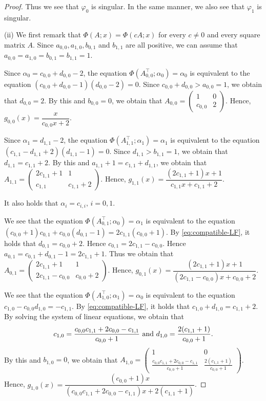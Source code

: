 \documentclass[a4paper, reqno, 11pt]{amsart}
\theoremstyle{definition}
\begin{document}
\begin{proof}
Thus we see that $\varphi_0$ is singular. 
In the same manner, we also see that $\varphi_1$ is singular. 

(ii) We first remark that $\Phi(A;x) = \Phi(cA;x)$ for every $c \ne 0$ and every square matrix $A$. 
Since $a_{0,0}, a_{1,0}, b_{0,1}$ and $b_{1,1}$ are all positive, 
we can assume that $a_{0,0} = a_{1,0} = b_{0,1} = b_{1,1} = 1$. 

Since $\alpha_0 = c_{0,0} + d_{0,0} - 2$, 
the equation $\Phi \left(A_{0,0}^{\top}; \alpha_0 \right) = \alpha_0$ is equivalent to  the equation $(c_{0,0} + d_{0,0} -1)(d_{0,0} - 2) = 0$. 
Since $c_{0,0} + d_{0,0} > a_{0,0} = 1$,  we obtain that $d_{0,0} = 2$. 
By this and $b_{0,0} = 0$, 
we obtain that 
$A_{0,0} = \begin{pmatrix} 1 & 0 \\ c_{0,0} & 2 \end{pmatrix}$.  
Hence, 
$g_{0,0}(x) = \dfrac{x}{c_{0,0} x + 2}$. 


Since $\alpha_1 =  d_{1,1} - 2$, 
the equation $\Phi \left(A_{1,1}^{\top}; \alpha_1 \right) = \alpha_1$ is equivalent to  the equation $(c_{1,1} - d_{1,1} + 2)(d_{1,1} - 1) = 0$. 
Since $d_{1,1} > b_{1,1} = 1$, we obtain that $d_{1,1} = c_{1,1} + 2$. 
By this and $a_{1,1} + 1 = c_{1,1} + d_{1,1}$, 
we obtain that 
$A_{1,1} = \begin{pmatrix} 2c_{1,1} + 1 & 1 \\ c_{1,1} & c_{1,1} + 2 \end{pmatrix}$.  
Hence, 
$g_{1,1}(x) = \dfrac{(2c_{1,1} + 1)x + 1}{c_{1,1} x + c_{1,1} + 2}$. 

It also holds that $\alpha_i = c_{i,i}, \, i = 0,1$. 


We see that the equation $\Phi \left(A_{0,1}^{\top}; \alpha_0 \right) = \alpha_1$ is equivalent to  the equation $(c_{0,0} + 1)c_{0,1} + c_{0,0} (d_{0,1} - 1) = 2c_{1,1} (c_{0,0} + 1)$. 
By \eqref{eq:compatible-LF}, 
it holds that $d_{0,1} = c_{0,0} + 2$.  
Hence $c_{0,1} = 2 c_{1,1} - c_{0,0}$. 
Hence $a_{0,1} = c_{0,1} + d_{0,1} - 1 = 2c_{1,1} + 1$. 
Thus we obtain that $A_{0,1} = \begin{pmatrix} 2c_{1,1} + 1 & 1 \\ 2c_{1,1} - c_{0,0} & c_{0,0} + 2 \end{pmatrix}$.  
Hence, 
$g_{0,1}(x) = \dfrac{(2c_{1,1} + 1)x + 1}{(2c_{1,1}-c_{0,0}) x + c_{0,0} + 2}$. 

We see that the equation $\Phi \left(A_{1,0}^{\top}; \alpha_1 \right) = \alpha_0$ is equivalent to  the equation $c_{1,0} - c_{0,0} d_{1,0} = -c_{1,1}$. 
By \eqref{eq:compatible-LF}, 
it holds that $c_{1,0} + d_{1,0} = c_{1,1} + 2$.  
By solving the system of linear equations, we obtain that 
\[ c_{1,0} = \frac{c_{0,0} c_{1,1} + 2 c_{0,0} - c_{1,1}}{c_{0,0} + 1} \textup{ and }  d_{1,0} = \frac{2(c_{1,1} + 1)}{c_{0,0} + 1}. \]
By this and $b_{1,0} = 0$, 
we obtain that 
$A_{1,0} = \begin{pmatrix} 1 & 0 \\  \frac{c_{0,0} c_{1,1} + 2 c_{0,0} - c_{1,1}}{c_{0,0} + 1}  & \frac{2(c_{1,1} + 1)}{c_{0,0} + 1} \end{pmatrix}$.  
Hence, 
$g_{1,0}(x) = \dfrac{(c_{0,0} + 1)x}{(c_{0,0} c_{1,1} + 2 c_{0,0} - c_{1,1}) x + 2(c_{1,1} + 1)}$. 


\end{proof}
\end{document}
